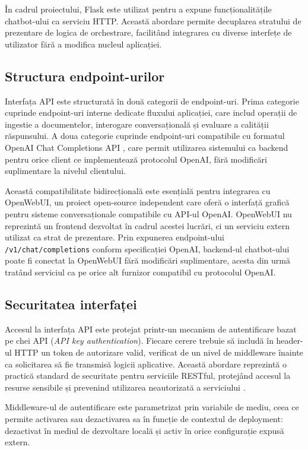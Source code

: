 \documentclass[12pt, a4paper, oneside, romanian]{teza-upb}
\begin{document}
În cadrul proiectului, Flask este utilizat pentru a expune funcționalitățile chatbot-ului ca serviciu HTTP. Această abordare permite decuplarea stratului de prezentare de logica de orchestrare, facilitând integrarea cu diverse interfețe de utilizator fără a modifica nucleul aplicației.

\subsection{Structura endpoint-urilor}

Interfața API este structurată în două categorii de endpoint-uri. Prima categorie cuprinde endpoint-uri interne dedicate fluxului aplicației, care includ operații de ingestie a documentelor, interogare conversațională și evaluare a calității răspunsului. A doua categorie cuprinde endpoint-uri compatibile cu formatul OpenAI Chat Completions API \cite{openai_api}, care permit utilizarea sistemului ca backend pentru orice client ce implementează protocolul OpenAI, fără modificări suplimentare la nivelul clientului.

Această compatibilitate bidirecțională este esențială pentru integrarea cu OpenWebUI, un proiect open-source independent care oferă o interfață grafică pentru sisteme conversaționale compatibile cu API-ul OpenAI. OpenWebUI nu reprezintă un frontend dezvoltat în cadrul acestei lucrări, ci un serviciu extern utilizat ca strat de prezentare. Prin expunerea endpoint-ului \texttt{/v1/chat/completions} conform specificației OpenAI, backend-ul chatbot-ului poate fi conectat la OpenWebUI fără modificări suplimentare, acesta din urmă tratând serviciul ca pe orice alt furnizor compatibil cu protocolul OpenAI.

\subsection{Securitatea interfaței}

Accesul la interfața API este protejat printr-un mecanism de autentificare bazat pe chei API (\textit{API key authentication}). Fiecare cerere trebuie să includă în header-ul HTTP un token de autorizare valid, verificat de un nivel de middleware înainte ca solicitarea să fie transmisă logicii aplicative. Această abordare reprezintă o practică standard de securitate pentru serviciile RESTful, protejând accesul la resurse sensibile și prevenind utilizarea neautorizată a serviciului \cite{flask_doc}.

Middleware-ul de autentificare este parametrizat prin variabile de mediu, ceea ce permite activarea sau dezactivarea sa în funcție de contextul de deployment: dezactivat în mediul de dezvoltare locală și activ în orice configurație expusă extern.
\end{document}
